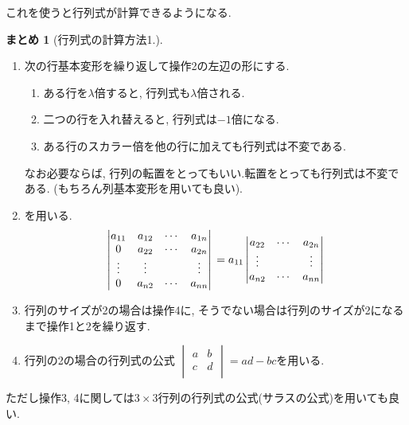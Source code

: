 \documentclass[dvipdfmx,a4paper,11pt]{article} %
\theoremstyle{definition}
\newtheorem{suma}[thm]{まとめ}
\begin{document}
これを使うと行列式が計算できるようになる. 
 \begin{tcolorbox}[mybox]
    \begin{suma}[行列式の計算方法1.]
    \text{}
    
    
\begin{enumerate}[label=\textbf{操作}\arabic*.]
 \item  次の行基本変形を繰り返して操作2の左辺の形にする. 
\begin{enumerate}
\item[(I)] ある行を$\lambda$倍すると, 行列式も$\lambda$倍される.
 \item[(II)] 二つの行を入れ替えると, 行列式は$-1$倍になる. 
 \item[(III)] ある行のスカラー倍を他の行に加えても行列式は不変である. 
\end{enumerate}
 なお必要ならば, 行列の転置をとってもいい.転置をとっても行列式は不変である. 
(もちろん列基本変形を用いても良い).
 \item \cite[定理 3.3.2]{O}を用いる.
 $$
\begin{vmatrix}
a_{11} & a_{12} & \cdots & a_{1n} \\
0 & a_{22} & \cdots & a_{2n} \\
\vdots & \vdots & & \vdots \\
0& a_{n2} & \cdots & a_{nn}
\end{vmatrix}\\
=
a_{11} 
\begin{vmatrix}
a_{22} & \cdots & a_{2n} \\
\vdots & & \vdots \\
a_{n2} & \cdots & a_{nn}
\end{vmatrix}
 $$
 \item 行列のサイズが2の場合は操作4に, そうでない場合は行列のサイズが2になるまで操作1と2を繰り返す. 
 \item 行列の2の場合の行列式の公式
 $\begin{vmatrix}
a& b\\
c&d\\
 \end{vmatrix} 
=ad-bc$を用いる. 
 \end{enumerate}
 \end{suma}
  \end{tcolorbox}
  ただし操作3, 4に関しては$3 \times 3$行列の行列式の公式(サラスの公式)を用いても良い. 
\end{document}
